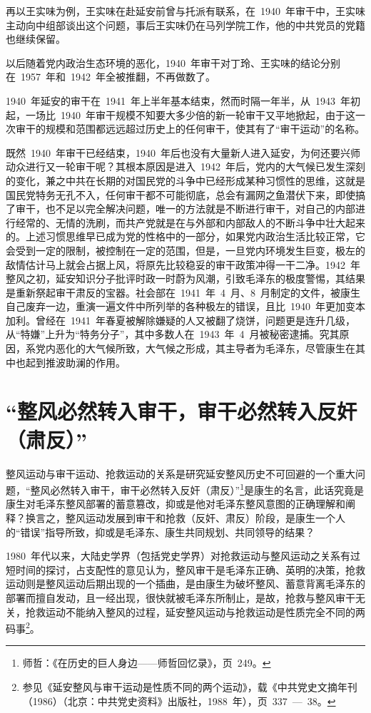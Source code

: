 再以王实味为例，王实味在赴延安前曾与托派有联系，在~1940~年审干中，王实味主动向中组部谈出这个问题，事后王实味仍在马列学院工作，他的中共党员的党籍也继续保留。

以后随着党内政治生态环境的恶化，1940~年审干对丁玲、王实味的结论分别在~1957~年和~1942~年全被推翻，不再做数了。

1940~年延安的审干在~1941~年上半年基本结束，然而时隔一年半，从~1943~年初起，一场比~1940~年审干规模不知要大多少倍的新一轮审干又平地掀起，由于这一次审干的规模和范围都远远超过历史上的任何审干，使其有了“审干运动”的名称。

既然~1940~年审干已经结束，1940~年后也没有大量新人进入延安，为何还要兴师动众进行又一轮审干呢？其根本原因是进入~1942~年后，党内的大气候已发生深刻的变化，兼之中共在长期的对国民党的斗争中已经形成某种习惯性的思维，这就是国民党特务无孔不入，任何审干都不可能彻底，总会有漏网之鱼潜伏下来，即使搞了审干，也不足以完全解决问题，唯一的方法就是不断进行审干，对自己的内部进行经常的、无情的洗刷，而共产党就是在与外部和内部敌人的不断斗争中壮大起来的。上述习惯思维早已成为党的性格中的一部分，如果党内政治生活比较正常，它会受到一定的限制，被控制在一定的范围，但是，一旦党内环境发生巨变，极左的敌情估计马上就会占据上风，将原先比较稳妥的审干政策冲得一干二净。1942~年整风之初，延安知识分子批评时政一时蔚为风潮，引致毛泽东的极度警惕，其结果是重新祭起审干肃反的宝器。社会部在~1941~年~4~月、8~月制定的文件，被康生自己废弃一边，重演一遍文件中所列举的各种极左的错误，且比~1940~年更加变本加利。曾经在~1941~年春夏被解除嫌疑的人又被翻了烧饼，问题更是连升几级，从“特嫌”上升为“特务分子”，其中多数人在~1943~年~4~月被秘密逮捕。究其原因，系党内恶化的大气候所致，大气候之形成，其主导者为毛泽东，尽管康生在其中也起到推波助澜的作用。

\section{“整风必然转入审干，审干必然转入反奸（肃反）”}

整风运动与审干运动、抢救运动的关系是研究延安整风历史不可回避的一个重大问题，“整风必然转入审干，审干必然转入反奸（肃反）”\footnote{师哲：《在历史的巨人身边——师哲回忆录》，页~249。}是康生的名言，此话究竟是康生对毛泽东整风部署的蓄意篡改，抑或是他对毛泽东整风意图的正确理解和阐释？换言之，整风运动发展到审干和抢救（反奸、肃反）阶段，是康生一个人的“错误”指导所致，抑或是毛泽东、康生共同规划、共同领导的结果？

1980~年代以来，大陆史学界（包括党史学界）对抢救运动与整风运动之关系有过短时间的探讨，占支配性的意见认为，整风审干是毛泽东正确、英明的决策，抢救运动则是整风运动后期出现的一个插曲，是由康生为破坏整风、蓄意背离毛泽东的部署而擅自发动，且一经出现，很快就被毛泽东所制止，是故，抢救与整风审干无关，抢救运动不能纳入整风的过程，延安整风运动与抢救运动是性质完全不同的两码事\footnote{参见《延安整风与审干运动是性质不同的两个运动》，载《中共党史文摘年刊（1986）（北京：中共党史资料》出版社，1988~年），页~337~—~38。}。

